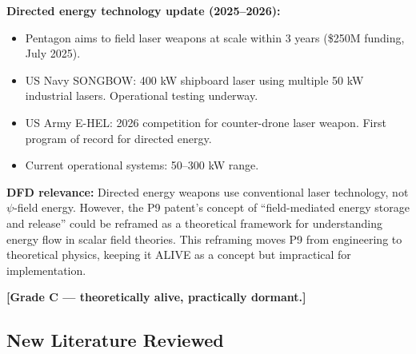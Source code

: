 \documentclass[11pt]{article}
\begin{document}
\textbf{Directed energy technology update (2025--2026):}
\begin{itemize}
  \item Pentagon aims to field laser weapons at scale within 3 years
    (\$250M funding, July 2025).
  \item US Navy SONGBOW: 400 kW shipboard laser using multiple 50 kW
    industrial lasers. Operational testing underway.
  \item US Army E-HEL: 2026 competition for counter-drone laser weapon.
    First program of record for directed energy.
  \item Current operational systems: 50--300 kW range.
\end{itemize}

\textbf{DFD relevance:} Directed energy weapons use conventional laser
technology, not $\psi$-field energy. However, the P9 patent's concept
of ``field-mediated energy storage and release'' could be reframed as
a theoretical framework for understanding energy flow in scalar field
theories. This reframing moves P9 from engineering to theoretical
physics, keeping it ALIVE as a concept but impractical for implementation.

\textbf{[Grade C --- theoretically alive, practically dormant.]}

\subsection{New Literature Reviewed}
\end{document}
